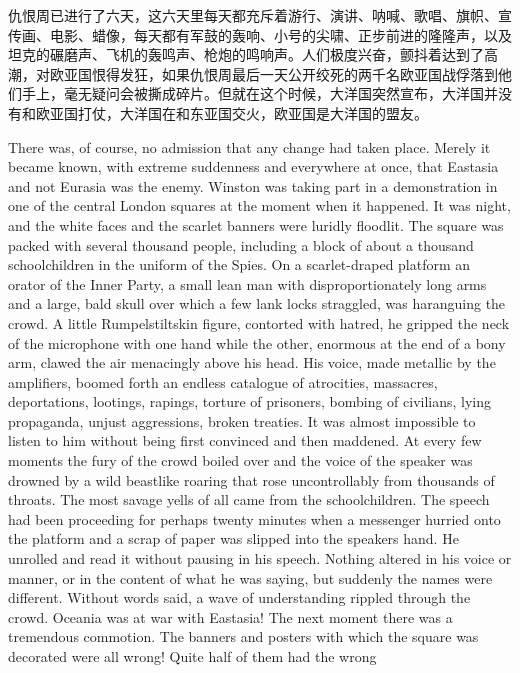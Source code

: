 \begin{paracol}{2}
\switchcolumn

仇恨周已进行了六天，这六天里每天都充斥着游行、演讲、呐喊、歌唱、旗帜、宣传画、电影、蜡像，每天都有军鼓的轰响、小号的尖啸、正步前进的隆隆声，以及坦克的碾磨声、飞机的轰鸣声、枪炮的鸣响声。人们极度兴奋，颤抖着达到了高潮，对欧亚国恨得发狂，如果仇恨周最后一天公开绞死的两千名欧亚国战俘落到他们手上，毫无疑问会被撕成碎片。但就在这个时候，大洋国突然宣布，大洋国并没有和欧亚国打仗，大洋国在和东亚国交火，欧亚国是大洋国的盟友。

\switchcolumn*

There was, of course, no admission that any change had taken place.
Merely it became known, with extreme suddenness and everywhere at once,
that Eastasia and not Eurasia was the enemy. Winston was taking part in
a demonstration in one of the central London squares at the moment when
it happened. It was night, and the white faces and the scarlet banners
were luridly floodlit. The square was packed with several thousand
people, including a block of about a thousand schoolchildren in the
uniform of the Spies. On a scarlet-draped platform an orator of the
Inner Party, a small lean man with disproportionately long arms and a
large, bald skull over which a few lank locks straggled, was haranguing
the crowd. A little Rumpelstiltskin figure, contorted with hatred, he
gripped the neck of the microphone with one hand while the other,
enormous at the end of a bony arm, clawed the air menacingly above his
head. His voice, made metallic by the amplifiers, boomed forth an
endless catalogue of atrocities, massacres, deportations, lootings,
rapings, torture of prisoners, bombing of civilians, lying propaganda,
unjust aggressions, broken treaties. It was almost impossible to listen
to him without being first convinced and then maddened. At every few
moments the fury of the crowd boiled over and the voice of the speaker
was drowned by a wild beastlike roaring that rose uncontrollably from
thousands of throats. The most savage yells of all came from the
schoolchildren. The speech had been proceeding for perhaps twenty
minutes when a messenger hurried onto the platform and a scrap of paper
was slipped into the speaker\textquotesingle s hand. He unrolled and
read it without pausing in his speech. Nothing altered in his voice or
manner, or in the content of what he was saying, but suddenly the names
were different. Without words said, a wave of understanding rippled
through the crowd. Oceania was at war with Eastasia! The next moment
there was a tremendous commotion. The banners and posters with which the
square was decorated were all wrong! Quite half of them had the wrong

\end{paracol}
